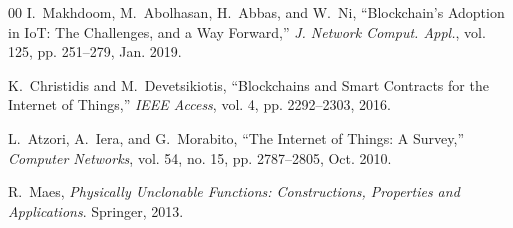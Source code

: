 \documentclass[conference]{IEEEtran}
\begin{document}
\begin{thebibliography}{00}
I.\ Makhdoom, M.\ Abolhasan, H.\ Abbas, and W.\ Ni,
``Blockchain's Adoption in IoT: The Challenges, and a Way Forward,''
\textit{J. Network Comput. Appl.}, vol. 125, pp. 251--279, Jan. 2019.

K.\ Christidis and M.\ Devetsikiotis,
``Blockchains and Smart Contracts for the Internet of Things,''
\textit{IEEE Access}, vol. 4, pp. 2292--2303, 2016.

L.\ Atzori, A.\ Iera, and G.\ Morabito,
``The Internet of Things: A Survey,''
\textit{Computer Networks}, vol. 54, no. 15, pp. 2787--2805, Oct. 2010.

R.\ Maes,
\textit{Physically Unclonable Functions: Constructions, Properties and Applications}.
Springer, 2013.

\end{thebibliography}
\end{document}
